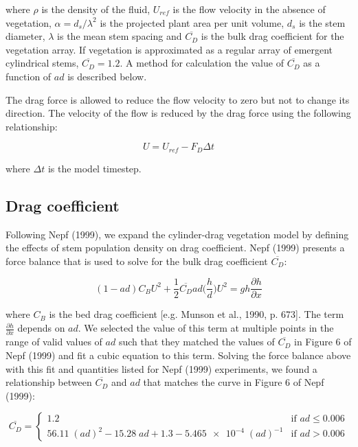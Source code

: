 \documentclass[10pt]{article}
\begin{document}
\noindent where $\rho$ is the density of the fluid, $U_{ref}$ is the flow velocity in the absence of vegetation, $\alpha=d_s/\lambda^2$ is the projected plant area per unit volume, $d_s$ is the stem diameter, $\lambda$ is the mean stem spacing and $\overline{C_D}$ is the bulk drag coefficient for the vegetation array. If vegetation is approximated as a regular array of emergent cylindrical stems, $\overline{C_D} = 1.2$. A method for calculation the value of $\overline{C_D}$ as a function of $ad$ is described below.

The drag force is allowed to reduce the flow velocity to zero but not to change its direction. The velocity of the flow is reduced by the drag force using the following relationship:

\begin{equation}
U = U_{ref} - F_D \Delta t
\end{equation}

\noindent where $\Delta t$ is the model timestep.

\subsection{Drag coefficient}

Following Nepf (1999), we expand the cylinder-drag vegetation model by defining the effects of stem population density on drag coefficient. Nepf (1999) presents a force balance that is used to solve for the bulk drag coefficient $\overline{C_D}$:

\begin{equation}
(1 - a d) C_B U^2 + \frac{1}{2} \overline{C_D} a d \big(\frac{h}{d}\big) U^2 = g h \frac{\partial h}{\partial x}
\end{equation}

\noindent where $C_B$ is the bed drag coefficient [e.g. Munson et al., 1990, p. 673]. The term $\frac{\partial h}{\partial x}$ depends on $a d$. We selected the value of this term at multiple points in the range of valid values of $a d$ such that they matched the values of $\overline{C_D}$ in Figure 6 of Nepf (1999) and fit a cubic equation to this term. Solving the force balance above with this fit and quantities listed for Nepf (1999) experiments, we found a relationship between $\overline{C_D}$ and $a d$ that matches the curve in Figure 6 of Nepf (1999):

\[
 \overline{C_D} = 
  \begin{cases} 
   1.2 & \text{if } a d \leq 0.006 \\
   56.11\;(ad)^2 - 15.28\;ad + 1.3 - \num{5.465e-4}\;(ad)^{-1}       & \text{if } ad > 0.006
  \end{cases}
\]
\end{document}
